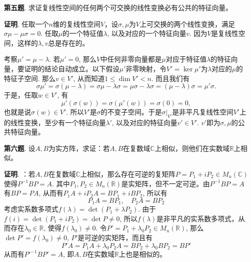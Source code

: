 \newpageorvspace


{\bf 第五题}. 求证复线性空间的任何两个可交换的线性变换必有公共的特征向量。

{\bf 证明}. 任取一个$n$维的复线性空间$V$，设$\sigma, \mu$为$V$上可交换的两个线性变换，满足$\sigma\mu - \mu\sigma = 0$. 任取$\mu$的一个特征值$\lambda$, 以及对应的一个特征向量$v$. 因为$V$是复线性空间，这样的$\lambda, v$总是存在的。

考察$\mu' = \mu - \lambda$. 若$\mu' = 0$, 那么$V$中任何非零向量都是$\mu$对应于特征值$\lambda$的特征向量，要证明的结论自动成立。以下假设$\mu'$非零映射，令$V' = \ker\mu'$为$\lambda$对应的$\mu$的特征子空间. 那么$v\in V'$, 从而知道$1 \leqslant \dim V' < n$. 而且我们有
$$\sigma\mu' = \sigma(\mu-\lambda) = \sigma\mu - \lambda\sigma = 
\mu\sigma - \lambda\sigma = (\mu-\lambda)\sigma = \mu'\sigma.$$
于是，任取$w\in V'$, 有
$$\mu'(\sigma(w)) = \sigma(\mu'(w)) = \sigma(0) = 0,$$
也就是说$\sigma(w) \in V'$. 所以$V'$是$\sigma$的不变子空间。于是$\sigma|_{V'}$是非平凡复线性空间$V'$上的线性变换，至少有一个特征向量$\lambda'$, 以及对应的特征向量$v'\in V'$. $v'$即为$\sigma, \mu$的公共特征向量。


\newpageorvspace


{\bf 第六题}. 设$A,B$为实方阵，求证：若$A,B$在复数域$\mathbb{C}$上相似，则他们在实数域$\mathbb{R}$上相似。

{\bf 证明}. ：若$A,B$在复数域$\mathbb{C}$上相似，那么存在可逆的复矩阵$P = P_1 + i P_2 \in M_n(\mathbb{C})$ 使得$P^{-1}BP = A$. 其中$P_1, P_2 \in M_n(\mathbb{R})$是实矩阵，但不一定可逆。由$P^{-1}BP = A$有$BP = PA$, 从而有$P_1A + i P_2A = BP_1 + i BP_2$, 所以有
$$P_1A = BP_1, \quad P_2A = BP_2$$
考虑实系数多项式$f(\lambda) = \det (P_1 + \lambda P_2)$. 由于$f(i) = \det (P_1 + i P_2) = \det P \neq 0$, 所以$f(\lambda)$是非平凡的实系数多项式，从而存在$\lambda_0 \in \mathbb{R}$, 使得$f(\lambda_0) \neq 0$. 令$P' = P_1 + \lambda_0 P_2 \in M_n(\mathbb{R})$, 那么$\det P' = f(\lambda_0) \neq 0$, $P'$是可逆的实矩阵，而且有
$$P'A = P_1A + \lambda_0 P_2A = BP_2 + \lambda_0 BP_2 = BP'$$
从而有$P'^{-1}BP' = A$, 即$A,B$在实数域$\mathbb{R}$上也是相似的。



